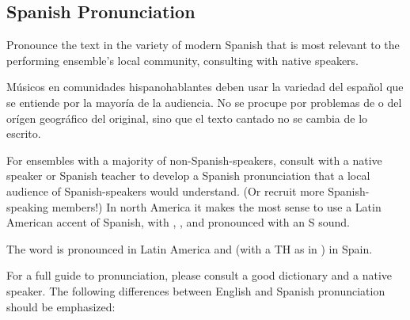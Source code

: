 \subsection*{Spanish Pronunciation}

\begin{epitome}
    Pronounce the text in the variety of modern Spanish that is most relevant to
    the performing ensemble's local community, consulting with native speakers.
\end{epitome}

Músicos en comunidades hispanohablantes deben usar la variedad del español que
se entiende por la mayoría de la audiencia.
No se procupe por problemas de  o del orígen geográfico del
original, sino que el texto cantado no se cambia de lo escrito.

For ensembles with a majority of non-Spanish-speakers, consult with a native
speaker or Spanish teacher to develop a Spanish pronunciation that a local
audience of Spanish-speakers would understand. 
(Or recruit more Spanish-speaking members!)
In north America it makes the most sense to use a Latin American accent of
Spanish, with , , and  pronounced with an S sound.

The word  is pronounced  in
Latin America and  (with a TH as in
) in Spain.

For a full guide to pronunciation, please consult a good dictionary and a native
speaker.
The following differences between English and Spanish pronunciation should be
emphasized:

